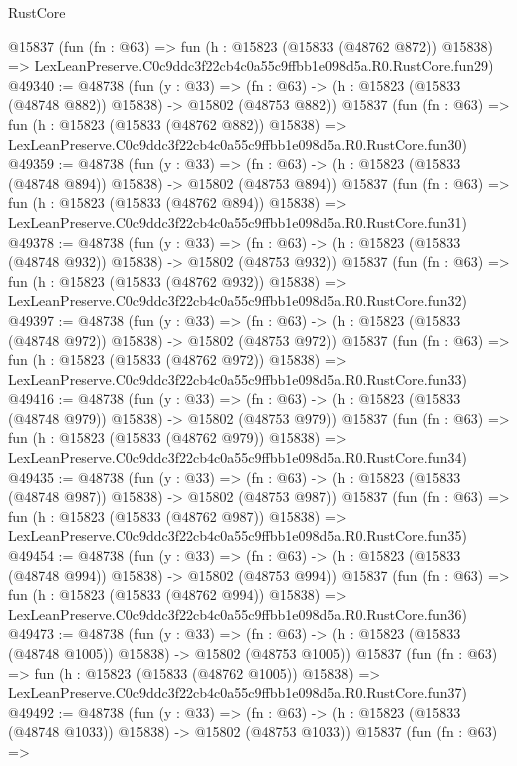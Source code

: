 \begin{lexlean}{RustCore}
\begin{coremodule}
    @15837
    (fun (fn : @63) =>
    fun (h : @15823 (@15833 (@48762 @872)) @15838) =>
    LexLeanPreserve.C0c9ddc3f22cb4c0a55c9ffbb1e098d5a.R0.RustCore.fun29)
@49340 := @48738
    (fun (y : @33) =>
    (fn : @63) -> (h : @15823 (@15833 (@48748 @882)) @15838) -> @15802 (@48753 @882))
    @15837
    (fun (fn : @63) =>
    fun (h : @15823 (@15833 (@48762 @882)) @15838) =>
    LexLeanPreserve.C0c9ddc3f22cb4c0a55c9ffbb1e098d5a.R0.RustCore.fun30)
@49359 := @48738
    (fun (y : @33) =>
    (fn : @63) -> (h : @15823 (@15833 (@48748 @894)) @15838) -> @15802 (@48753 @894))
    @15837
    (fun (fn : @63) =>
    fun (h : @15823 (@15833 (@48762 @894)) @15838) =>
    LexLeanPreserve.C0c9ddc3f22cb4c0a55c9ffbb1e098d5a.R0.RustCore.fun31)
@49378 := @48738
    (fun (y : @33) =>
    (fn : @63) -> (h : @15823 (@15833 (@48748 @932)) @15838) -> @15802 (@48753 @932))
    @15837
    (fun (fn : @63) =>
    fun (h : @15823 (@15833 (@48762 @932)) @15838) =>
    LexLeanPreserve.C0c9ddc3f22cb4c0a55c9ffbb1e098d5a.R0.RustCore.fun32)
@49397 := @48738
    (fun (y : @33) =>
    (fn : @63) -> (h : @15823 (@15833 (@48748 @972)) @15838) -> @15802 (@48753 @972))
    @15837
    (fun (fn : @63) =>
    fun (h : @15823 (@15833 (@48762 @972)) @15838) =>
    LexLeanPreserve.C0c9ddc3f22cb4c0a55c9ffbb1e098d5a.R0.RustCore.fun33)
@49416 := @48738
    (fun (y : @33) =>
    (fn : @63) -> (h : @15823 (@15833 (@48748 @979)) @15838) -> @15802 (@48753 @979))
    @15837
    (fun (fn : @63) =>
    fun (h : @15823 (@15833 (@48762 @979)) @15838) =>
    LexLeanPreserve.C0c9ddc3f22cb4c0a55c9ffbb1e098d5a.R0.RustCore.fun34)
@49435 := @48738
    (fun (y : @33) =>
    (fn : @63) -> (h : @15823 (@15833 (@48748 @987)) @15838) -> @15802 (@48753 @987))
    @15837
    (fun (fn : @63) =>
    fun (h : @15823 (@15833 (@48762 @987)) @15838) =>
    LexLeanPreserve.C0c9ddc3f22cb4c0a55c9ffbb1e098d5a.R0.RustCore.fun35)
@49454 := @48738
    (fun (y : @33) =>
    (fn : @63) -> (h : @15823 (@15833 (@48748 @994)) @15838) -> @15802 (@48753 @994))
    @15837
    (fun (fn : @63) =>
    fun (h : @15823 (@15833 (@48762 @994)) @15838) =>
    LexLeanPreserve.C0c9ddc3f22cb4c0a55c9ffbb1e098d5a.R0.RustCore.fun36)
@49473 := @48738
    (fun (y : @33) =>
    (fn : @63) -> (h : @15823 (@15833 (@48748 @1005)) @15838) -> @15802 (@48753 @1005))
    @15837
    (fun (fn : @63) =>
    fun (h : @15823 (@15833 (@48762 @1005)) @15838) =>
    LexLeanPreserve.C0c9ddc3f22cb4c0a55c9ffbb1e098d5a.R0.RustCore.fun37)
@49492 := @48738
    (fun (y : @33) =>
    (fn : @63) -> (h : @15823 (@15833 (@48748 @1033)) @15838) -> @15802 (@48753 @1033))
    @15837
    (fun (fn : @63) =>

\end{coremodule}
\end{lexlean}
